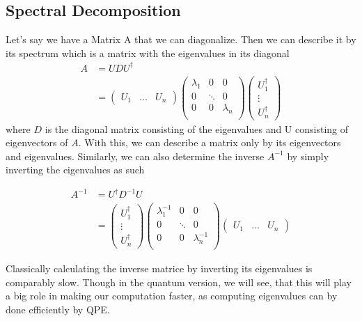 \subsection{Spectral Decomposition}
Let's say we have a Matrix A that we can diagonalize. 
Then we can describe it by its spectrum which is a matrix with the eigenvalues in its diagonal
\begin{equation} 
\begin{split}
A &=  U D U^{\dagger} \\
&= \begin{pmatrix} U_1 & \dots & U_n \end{pmatrix} \begin{pmatrix} \lambda_1 & 0 & 0 \\  0 & \ddots & 0\\ 0 & 0& \lambda_n \\ \end{pmatrix} \begin{pmatrix} U^\dagger_1 \\ \vdots \\ U^\dagger_n \end{pmatrix}
\end{split}
\end{equation}
where $D$ is the diagonal matrix consisting of the eigenvalues and U consisting of eigenvectors of $A$.
With this, we can describe a matrix only by its eigenvectors and eigenvalues. 
Similarly, we can also determine the inverse $A^{-1}$ by simply inverting the eigenvalues as such

\begin{equation}
\begin{split}
 A^{-1} 
 &=  U^{\dagger} D^{-1} U\\
 &= \begin{pmatrix} U^\dagger_1 \\ \vdots \\ U^\dagger_n \end{pmatrix}
\begin{pmatrix} \lambda_1^{-1} & 0 & 0\\ 0 & \ddots & 0\\ 0 & 0& \lambda_n^{-1} \\ \end{pmatrix}
\begin{pmatrix} U_1 & \dots & U_n \end{pmatrix} 
\end{split}
\end{equation}


Classically calculating the inverse matrice by inverting its eigenvalues is comparably slow. 
Though in the quantum version, we will see, that this will play a big role in making our computation faster, as computing eigenvalues can by done efficiently by QPE.

